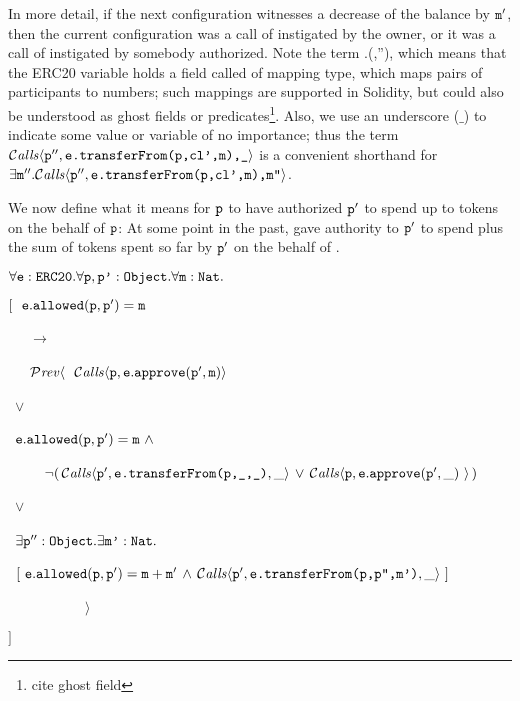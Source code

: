 \noindent
In more detail, if the next configuration witnesses a decrease of the balance by
 ${\mbox{\tt{m}}}'$, then the current configuration was a call of  instigated by
 the owner, or it was a call of  instigated by somebody authorized.
Note the term .(,''), which means that the
ERC20 variable  holds a field called  of   mapping type, which maps pairs of participants to numbers; such
mappings are supported in Solidity\cite{Solidity}, but could also be understood as ghost fields or predicates\footnote{cite ghost field}.
Also, %
we use an underscore ($\_$) to indicate some value or variable of no importance; thus the term ${\mathcal{C}}\textrm{\textit{alls}}\langle {\mbox{\tt{p}}}'',{\mbox{\tt{e.transferFrom(p,cl',m),\_}}}\rangle$ is a convenient shorthand for 
$\exists {\mbox{\tt{m}}}''.{\mathcal{C}}\textrm{\textit{alls}}\langle {\mbox{\tt{p}}}'',{\mbox{\tt{e.transferFrom(p,cl',m),m''}}}\rangle$.

We now define what it means for ${\mbox{\tt{p}}}$ to have authorized ${\mbox{\tt{p}}}'$ to  spend 
up to  tokens on the behalf of ${\mbox{\tt{p}}}$: At some point in the
past,   gave authority to ${\mbox{\tt{p}}}'$  to spend   
plus the sum of  tokens
spent so far by ${\mbox{\tt{p}}}' $ on the behalf of . 

 
\vspace{.15cm}
\noindent
 $\forall {\mbox{\tt{e}}}:{\mbox{\tt{ERC20}}}.\forall {\mbox{\tt{p}}},{\mbox{\tt{p'}}}:{\mbox{\tt{Object}}}.\forall {\mbox{\tt{m}}}:{\mbox{\tt{Nat}}}.$\\
\strut \hspace{0.3cm} $[\ \ \prg{e}.\prg{allowed}(\prg{p},\prg{p}')=\prg{m} $\\
\strut \hspace{0.4cm} \ \ \ $\longrightarrow$\\
\strut \hspace{0.4cm} \ \ \  
     $\PrevId\langle\ \  \Calls{\prg{p},\prg{e}.\prg{approve}(\prg{p}',\prg{m})} $\\
      \strut \hspace{1.7cm} \ $\vee $\\
\strut \hspace{1.7cm} \  
     $    {\mbox{\tt{e}}}.{\mbox{\tt{allowed}}}({\mbox{\tt{p}}},{\mbox{\tt{p}}}')={\mbox{\tt{m}}}   
        \  \wedge\ $\\
\strut \hspace{1.5cm} \ \ \ \ \          $  \neg   (\, {\mathcal{C}}\textrm{\textit{alls}}\langle {\mbox{\tt{p}}}',{\mbox{\tt{e.transferFrom(p,\_,\_)}}},\_ \rangle\, \vee \, {\mathcal{C}}\textrm{\textit{alls}}\langle {\mbox{\tt{p}}},{\mbox{\tt{e}}}.{\mbox{\tt{approve}}}({\mbox{\tt{p}}}',\_)\ \rangle\, ) $\\
      \strut \hspace{1.7cm}\  $\vee $\\
\strut \hspace{1.7cm}   \  $ \exists {\mbox{\tt{p}}}'':{\mbox{\tt{Object}}}.\exists{\mbox{\tt{m'}}}:{\mbox{\tt{Nat}}}.$\\
 \strut \hspace{1.7cm}\  $[\   
  {\mbox{\tt{e}}}.{\mbox{\tt{allowed}}}({\mbox{\tt{p}}},{\mbox{\tt{p}}}')={\mbox{\tt{m}}}+{\mbox{\tt{m}}}'  \, \wedge\,   {\mathcal{C}}\textrm{\textit{alls}}\langle {\mbox{\tt{p}}}',{\mbox{\tt{e.transferFrom(p,p'',{\mbox{\tt{m}}}')}}},\_ \rangle\  ]$\\
\strut \hspace{0.4cm} \ \ \  \ \ \  \ \ \ \ \ $\rangle $\\
\strut \hspace{0.3cm} $]$
\vspace{.15cm}
 
